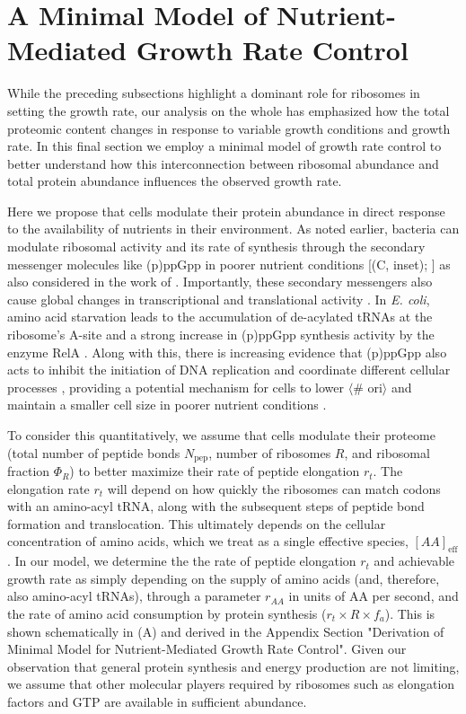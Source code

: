 \section{A Minimal Model of Nutrient-Mediated Growth Rate Control}
\label{sec:minimal_model}
While the preceding subsections highlight a dominant role for ribosomes in
setting the growth rate, our analysis on the whole has emphasized how the total
proteomic content changes in response to variable growth conditions and
growth rate. In this final section we employ a minimal model of growth rate control
to better understand how this interconnection between ribosomal abundance and
total protein abundance influences the observed growth rate.

Here we propose that cells modulate their protein abundance in direct response
to the availability of nutrients in their environment. As noted earlier,
bacteria can modulate ribosomal activity and its rate of synthesis through the
secondary messenger molecules like (p)ppGpp in poorer nutrient conditions
[(C, inset); \cite{dai2016}] as also considered in the work of
\cite{bosdriesz2015}. Importantly, these secondary messengers also cause global
changes in transcriptional and translational activity \citep{hauryliuk2015,
zhu2019, Buke2020}. In \textit{E. coli}, amino acid starvation leads to the
accumulation of de-acylated tRNAs at the ribosome's A-site and a strong increase
in (p)ppGpp synthesis activity by the enzyme RelA \citep{hauryliuk2015}. Along
with this,  there is increasing evidence that (p)ppGpp also acts to inhibit the
initiation of DNA replication and coordinate different cellular processes
\citep{kraemer2019, vadia2017}, providing a potential mechanism for cells to
lower $\langle$\# ori$\rangle$ and maintain a smaller cell size in poorer
nutrient conditions \citep{fernandezcoll2020}.

To consider this quantitatively, we assume that cells modulate their proteome
(total number of peptide bonds $N_\text{pep}$, number of ribosomes $R$, and
ribosomal fraction $\Phi_R$) to better maximize their rate of peptide elongation
$r_t$. The elongation rate $r_t$ will depend on how quickly the ribosomes can
match codons with an amino-acyl tRNA, along with the subsequent steps of peptide
bond formation and translocation. This ultimately depends on the cellular
concentration of amino acids, which we treat as a single effective species,
$[AA]_\text{eff}$. In our model, we determine the the rate of peptide elongation
$r_t$ and achievable growth rate as simply depending on the supply of amino
acids (and, therefore, also amino-acyl tRNAs), through a parameter $r_{AA}$ in
units of AA per second, and the rate of amino acid consumption by protein
synthesis ($r_t \times R \times f_a$). This is shown schematically in
(A) and derived in the Appendix Section "Derivation
of Minimal Model for Nutrient-Mediated Growth Rate Control". Given our
observation that general protein synthesis and energy production are not limiting, we
assume that other molecular players required by ribosomes such as elongation
factors and GTP are available in sufficient abundance.

